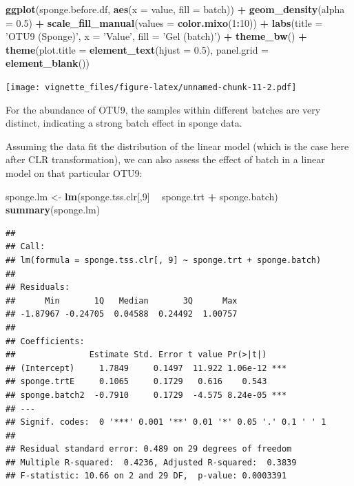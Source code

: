 \documentclass[]{book}
\newenvironment{Shaded}{\begin{snugshade}}{\end{snugshade}}
\newcommand{\KeywordTok}[1]{\textcolor[rgb]{0.13,0.29,0.53}{\textbf{#1}}}
\newcommand{\DataTypeTok}[1]{\textcolor[rgb]{0.13,0.29,0.53}{#1}}
\newcommand{\DecValTok}[1]{\textcolor[rgb]{0.00,0.00,0.81}{#1}}
\newcommand{\FloatTok}[1]{\textcolor[rgb]{0.00,0.00,0.81}{#1}}
\newcommand{\StringTok}[1]{\textcolor[rgb]{0.31,0.60,0.02}{#1}}
\newcommand{\OperatorTok}[1]{\textcolor[rgb]{0.81,0.36,0.00}{\textbf{#1}}}
\newcommand{\NormalTok}[1]{#1}
\begin{document}
\begin{Shaded}
\begin{Highlighting}[]
\KeywordTok{ggplot}\NormalTok{(sponge.before.df, }\KeywordTok{aes}\NormalTok{(}\DataTypeTok{x =}\NormalTok{ value, }\DataTypeTok{fill =}\NormalTok{ batch)) }\OperatorTok{+}\StringTok{ }
\StringTok{  }\KeywordTok{geom_density}\NormalTok{(}\DataTypeTok{alpha =} \FloatTok{0.5}\NormalTok{) }\OperatorTok{+}\StringTok{ }\KeywordTok{scale_fill_manual}\NormalTok{(}\DataTypeTok{values =} \KeywordTok{color.mixo}\NormalTok{(}\DecValTok{1}\OperatorTok{:}\DecValTok{10}\NormalTok{)) }\OperatorTok{+}\StringTok{ }
\StringTok{  }\KeywordTok{labs}\NormalTok{(}\DataTypeTok{title =} \StringTok{'OTU9 (Sponge)'}\NormalTok{, }\DataTypeTok{x =} \StringTok{'Value'}\NormalTok{, }\DataTypeTok{fill =} \StringTok{'Gel (batch)'}\NormalTok{) }\OperatorTok{+}\StringTok{ }
\StringTok{  }\KeywordTok{theme_bw}\NormalTok{() }\OperatorTok{+}\StringTok{ }\KeywordTok{theme}\NormalTok{(}\DataTypeTok{plot.title =} \KeywordTok{element_text}\NormalTok{(}\DataTypeTok{hjust =} \FloatTok{0.5}\NormalTok{), }
                     \DataTypeTok{panel.grid =} \KeywordTok{element_blank}\NormalTok{())}
\end{Highlighting}
\end{Shaded}

\texttt{[image: vignette\_files/figure-latex/unnamed-chunk-11-2.pdf]}

For the abundance of OTU9, the samples within different batches are very
distinct, indicating a strong batch effect in sponge data.

Assuming the data fit the distribution of the linear model (which is the
case here after CLR transformation), we can also assess the effect of
batch in a linear model on that particular OTU9:

\begin{Shaded}
\begin{Highlighting}[]
\NormalTok{sponge.lm <-}\StringTok{ }\KeywordTok{lm}\NormalTok{(sponge.tss.clr[,}\DecValTok{9}\NormalTok{] }\OperatorTok{~}\StringTok{ }\NormalTok{sponge.trt }\OperatorTok{+}\StringTok{ }\NormalTok{sponge.batch)}
\KeywordTok{summary}\NormalTok{(sponge.lm)}
\end{Highlighting}
\end{Shaded}

\begin{verbatim}
## 
## Call:
## lm(formula = sponge.tss.clr[, 9] ~ sponge.trt + sponge.batch)
## 
## Residuals:
##      Min       1Q   Median       3Q      Max 
## -1.87967 -0.24705  0.04588  0.24492  1.00757 
## 
## Coefficients:
##               Estimate Std. Error t value Pr(>|t|)    
## (Intercept)     1.7849     0.1497  11.922 1.06e-12 ***
## sponge.trtE     0.1065     0.1729   0.616    0.543    
## sponge.batch2  -0.7910     0.1729  -4.575 8.24e-05 ***
## ---
## Signif. codes:  0 '***' 0.001 '**' 0.01 '*' 0.05 '.' 0.1 ' ' 1
## 
## Residual standard error: 0.489 on 29 degrees of freedom
## Multiple R-squared:  0.4236, Adjusted R-squared:  0.3839 
## F-statistic: 10.66 on 2 and 29 DF,  p-value: 0.0003391
\end{verbatim}
\end{document}
